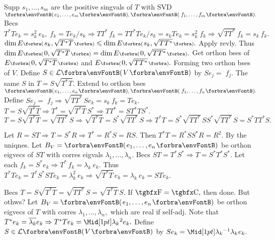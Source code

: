 Supp $s_1,\dots,s_m$ are the positive singvals of $T$ with SVD $\Par{e_1,\dots,e_m},\Par{\,f_1,\dots,f_m}.$\vspace{1pt}\parSol{}
Becs $T^*Te_k=s_k^2\:\!e_k,\;f_k=Te_k\big/s_k\Rightarrow TT^*\,f_k=TT^*Te_k\big/s_k=s_kTe_k=s_k^2\;f_k\Rightarrow\sqrt{TT^*}\:f_k=s_k\:f_k.$\vspace{1pt}\parSol{}
$\dim E\BigPar{s_k,\sqrt{T^*T}}\leqslant\dim E\BigPar{s_k,\sqrt{TT^*}}.$ Apply revly. Thus $\dim E\BigPar{0,\sqrt{T^*T}}=\dim E\BigPar{0,\sqrt{TT^*}}.$\vspace{1pt}\parSol{}
Get orthon bses of $E\BigPar{0,\sqrt{T^*T}}$ and $E\BigPar{0,\sqrt{TT^*}}.$ Forming two orthon bses of $V.$\parSol{}
Define $S\in\Lm{V}$ by $Se_j=\;\!f_j.$ \quad\ANote The same $S$ in $T=S\sqrt{T^*T}.$\PfEnd\vspace{2pt}\parSol{}
\Or Extend to orthon bses $\Par{e_1,\dots,e_n},\Par{\,f_1,\dots,f_n}.$ Define $Se_j=\;\!f_j\Rightarrow\sqrt{TT^*}\,Se_k=s_k\:f_k=Te_k.$\PfEnd\vspace{4pt}
\ACoro $T=S\sqrt{T^*T}\Rightarrow T^*=\sqrt{T^*T}\,S^*\Longrightarrow TT^*=ST^*TS^*.$\parCor
\Or $T=S\sqrt{T^*T}=\sqrt{TT^*}\,S\Rightarrow \sqrt{T^*T}=S^*\sqrt{TT^*}\,S\Longrightarrow T^*T=S^*\sqrt{TT^*}\,SS^*\sqrt{TT^*}\,S=S^*TT^*S.$
\SepLine

Let $R=ST\Rightarrow T=S^*R\Rightarrow T^*=R^*S=RS.$ Then $T^*T=R^*SS^*R=R^2.$ \;By the uniqnes.\PfEnd\vspace{2pt}\parSol{}
\Or Let $B_V=\Par{e_1,\dots,e_n}$ be orthon eigvecs of $ST$ with corres eigvals $\lambda_1,\dots,\lambda_n.$\parSol{}
Becs $ST=T^*S^*\Rightarrow T=S^*T^*S^*.$ \;Let each \:$f_k=S^*e_k\Rightarrow T^*\,f_k=\lambda_k\:\!e_k.$\parSol{}
Thus $T^*Te_k=T^*S^*STe_k=\lambda_k^2\:\!e_k\Rightarrow\sqrt{T^*T}\,e_k=\lambda_k\:\!e_k=STe_k.$\PfEnd
\SepLine

Becs $T=S\sqrt{T^*T}=\sqrt{TT^*}\,S=\sqrt{T^*T}\,S.$ \;If $\Fbb=\Cbb,$ then done. But othws\:?\parSol{}
Let $B_V=\Par{e_1,\dots,e_n}$ be orthon eigvecs of $T$ with corres $\lambda_1,\dots,\lambda_n,$ which are real if self-adj.\parSol{}
Note that $T^*e_k=\overline{\lambda_k}e_k\Rightarrow T^*Te_k=\aMidsq{\lambda_k}e_k.$ \;Define $S\in\Lm{V}$ by $Se_k=\aMid{\lambda_k}{^{-1}}\lambda_k\:\!e_k.$\PfEnd
\SepLine

